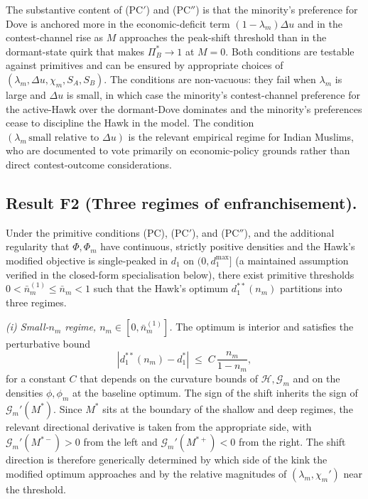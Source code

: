 \documentclass[11pt,twoside]{extarticle}
\begin{document}
The substantive content of (PC$'$) and (PC$''$) is that the minority's preference for Dove is anchored more in the economic-deficit term $(1-\lambda_m)\Delta u$ and in the contest-channel rise as $M$ approaches the peak-shift threshold than in the dormant-state quirk that makes $\Pi_B^{*}\to 1$ at $M=0$. Both conditions are testable against primitives and can be ensured by appropriate choices of $(\lambda_m,\Delta u,\chi_m,S_A,S_B)$. The conditions are non-vacuous: they fail when $\lambda_m$ is large and $\Delta u$ is small, in which case the minority's contest-channel preference for the active-Hawk over the dormant-Dove dominates and the minority's preferences cease to discipline the Hawk in the model. The condition $(\lambda_m\,\text{small relative to }\Delta u)$ is the relevant empirical regime for Indian Muslims, who are documented to vote primarily on economic-policy grounds rather than direct contest-outcome considerations.

\subsection*{Result F2 (Three regimes of enfranchisement).} Under the primitive conditions (PC), (PC$'$), and (PC$''$), and the additional regularity that $\Phi,\Phi_m$ have continuous, strictly positive densities and the Hawk's modified objective is single-peaked in $d_1$ on $(0,d_1^{\max}]$ (a maintained assumption verified in the closed-form specialisation below), there exist primitive thresholds $0<\bar n_m^{(1)}\le\bar n_m<1$ such that the Hawk's optimum $d_1^{**}(n_m)$ partitions into three regimes.

\medskip\noindent\textit{(i) Small-$n_m$ regime, $n_m\in[0,\bar n_m^{(1)}]$.} The optimum is interior and satisfies the perturbative bound
\begin{equation}\label{eq:perturb_bound_oaF}
    |d_1^{**}(n_m)-d_1^{*}|\;\le\;C\,\frac{n_m}{1-n_m},
\end{equation}
for a constant $C$ that depends on the curvature bounds of $\mathcal H,\mathcal G_m$ and on the densities $\phi,\phi_m$ at the baseline optimum. The sign of the shift inherits the sign of $\mathcal G_m'(M^{*})$. Since $M^{*}$ sits at the boundary of the shallow and deep regimes, the relevant directional derivative is taken from the appropriate side, with $\mathcal G_m'(M^{*-})>0$ from the left and $\mathcal G_m'(M^{*+})<0$ from the right. The shift direction is therefore generically determined by which side of the kink the modified optimum approaches and by the relative magnitudes of $(\lambda_m,\chi_m')$ near the threshold.
\end{document}
